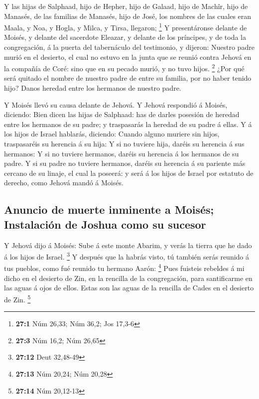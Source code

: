  Y las hijas de Salphaad, hijo de Hepher, hijo de Galaad,
hijo de Machîr, hijo de Manasés, de las familias de Manasés, hijo de
José, los nombres de las cuales eran Maala, y Noa, y Hogla, y Milca, y
Tirsa, llegaron; \footnote{\textbf{27:1} Núm 26,33; Núm 36,2; Jos 17,3-6}
 Y presentáronse delante de Moisés, y delante del
sacerdote Eleazar, y delante de los príncipes, y de toda la
congregación, á la puerta del tabernáculo del testimonio, y dijeron:
 Nuestro padre murió en el desierto, el cual no estuvo en
la junta que se reunió contra Jehová en la compañía de Coré: sino que en
su pecado murió, y no tuvo hijos. \footnote{\textbf{27:3} Núm 16,2; Núm
  26,65}  ¿Por qué será quitado el nombre de nuestro padre
de entre su familia, por no haber tenido hijo? Danos heredad entre los
hermanos de nuestro padre.

 Y Moisés llevó su causa delante de Jehová. 
Y Jehová respondió á Moisés, diciendo:  Bien dicen las
hijas de Salphaad: has de darles posesión de heredad entre los hermanos
de su padre; y traspasarás la heredad de su padre á ellas.
 Y á los hijos de Israel hablarás, diciendo: Cuando alguno
muriere sin hijos, traspasaréis su herencia á su hija:  Y
si no tuviere hija, daréis su herencia á sus hermanos:  Y
si no tuviere hermanos, daréis su herencia á los hermanos de su padre.
 Y si su padre no tuviere hermanos, daréis su herencia á
su pariente más cercano de su linaje, el cual la poseerá: y será á los
hijos de Israel por estatuto de derecho, como Jehová mandó á Moisés.

\hypertarget{anuncio-de-muerte-inminente-a-moisuxe9s-instalaciuxf3n-de-joshua-como-su-sucesor}{%
\subsection{Anuncio de muerte inminente a Moisés; Instalación de Joshua
como su
sucesor}\label{anuncio-de-muerte-inminente-a-moisuxe9s-instalaciuxf3n-de-joshua-como-su-sucesor}}

 Y Jehová dijo á Moisés: Sube á este monte Abarim, y
verás la tierra que he dado á los hijos de Israel. \footnote{\textbf{27:12}
  Deut 32,48-49}  Y después que la habrás visto, tú
también serás reunido á tus pueblos, como fué reunido tu hermano Aarón:
\footnote{\textbf{27:13} Núm 20,24; Núm 20,28}  Pues
fuisteis rebeldes á mi dicho en el desierto de Zin, en la rencilla de la
congregación, para santificarme en las aguas á ojos de ellos. Estas son
las aguas de la rencilla de Cades en el desierto de Zin. \footnote{\textbf{27:14}
  Núm 20,12-13}

